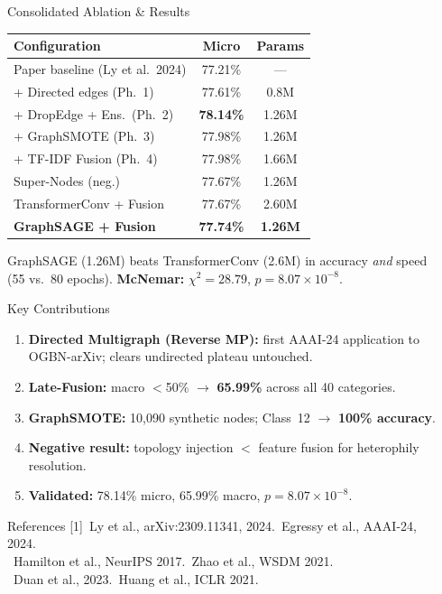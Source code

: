 \documentclass[final]{beamer}
\newlength{\sepwidth}
\newlength{\colwidth}
\newcommand{\separatorcolumn}{\begin{column}{\sepwidth}\end{column}}
\begin{document}
\begin{frame}[t]
\begin{columns}[t]
\begin{column}{\colwidth}
  \begin{block}{Consolidated Ablation \& Results}
    \begin{center}
    \begin{tabular}{lcc}
      \toprule
      \textbf{Configuration} & \textbf{Micro} & \textbf{Params}\\
      \midrule
      Paper baseline (Ly et al.\ 2024) & 77.21\% & ---\\
      + Directed edges (Ph.~1)         & 77.61\% & 0.8M\\
      + DropEdge + Ens.\ (Ph.~2)       & \textbf{78.14\%} & 1.26M\\
      + GraphSMOTE (Ph.~3)             & 77.98\% & 1.26M\\
      + TF-IDF Fusion (Ph.~4)          & 77.98\% & 1.66M\\
      \midrule
      Super-Nodes (neg.)               & 77.67\% & 1.26M\\
      TransformerConv + Fusion         & 77.67\% & 2.60M\\
      \textbf{GraphSAGE + Fusion}      & \textbf{77.74\%} & \textbf{1.26M}\\
      \bottomrule
    \end{tabular}
    \end{center}
    GraphSAGE (1.26M) beats TransformerConv (2.6M) in accuracy \emph{and}
    speed (55 vs.\ 80 epochs). \textbf{McNemar:}
    $\chi^2{=}28.79$, $p{=}8.07{\times}10^{-8}$.
  \end{block}

  \begin{exampleblock}{Key Contributions}
    \begin{enumerate}
      \item \textbf{Directed Multigraph (Reverse MP):} first AAAI-24
            application to OGBN-arXiv; clears undirected plateau untouched.
      \item \textbf{Late-Fusion:} macro $<$50\%
            $\to$ \textbf{65.99\%} across all 40 categories.
      \item \textbf{GraphSMOTE:} 10{,}090 synthetic nodes;
            Class~12 $\to$ \textbf{100\% accuracy}.
      \item \textbf{Negative result:} topology injection $<$ feature fusion
            for heterophily resolution.
      \item \textbf{Validated:} 78.14\% micro, 65.99\% macro,
            $p{=}8.07{\times}10^{-8}$.
    \end{enumerate}
  \end{exampleblock}

  \begin{block}{References}
    \footnotesize
    [1]~Ly et al., arXiv:2309.11341, 2024.\quad
    [2]~Egressy et al., AAAI-24, 2024.\\
    [3]~Hamilton et al., NeurIPS 2017.\quad
    [4]~Zhao et al., WSDM 2021.\\
    [5]~Duan et al., 2023.\quad
    [6]~Huang et al., ICLR 2021.
  \end{block}

\end{column}
\separatorcolumn
\end{columns}
\end{frame}
\end{document}
